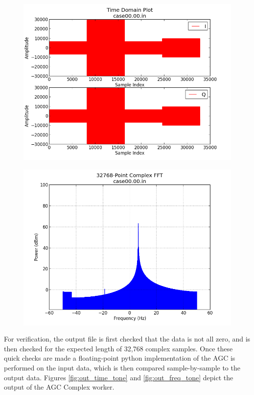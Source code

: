 \documentclass{article}
\def\Comp{AGC Complex}
\begin{document}
	\begin{figure}[ht]
		\centering
		\begin{minipage}{.5\textwidth}
			\centering\includegraphics[width=1.0\linewidth]{input_time}
			\label{fig:in_time_tone}
		\end{minipage}%
		\begin{minipage}{.5\textwidth}
			\centering\includegraphics[width=1.0\linewidth]{input_freq}
			\label{fig:in_freq_tone}
		\end{minipage}
	\end{figure}

\begin{flushleft}
	For verification, the output file is first checked that the data is not all zero, and is then checked for the expected length of 32,768 complex samples. Once these quick checks are made a floating-point python implementation of the AGC is performed on the input data, which is then compared sample-by-sample to the output data. Figures \ref{fig:out_time_tone} and \ref{fig:out_freq_tone} depict the output of the {\Comp} worker.
\end{flushleft}
\newpage
\end{document}
